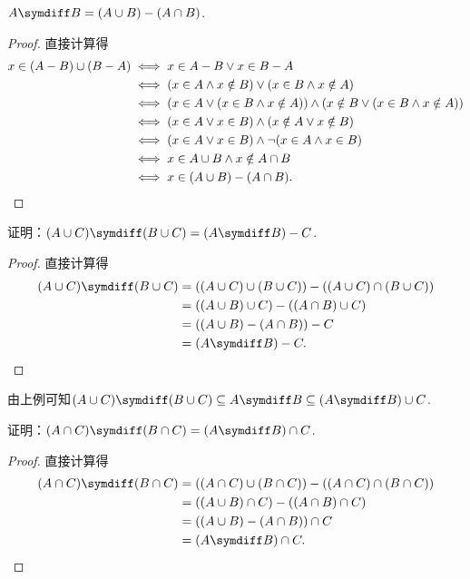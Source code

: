 \begin{theorem}
\(A \symdiff B = (A \cup B)-(A \cap B)\).
\begin{proof}
直接计算得
\begin{align*}
	x\in(A-B)\cup(B-A)
	&\iff x \in A-B \lor x \in B-A \\
	&\iff (x \in A \land x \notin B) \lor (x \in B \land x \notin A) \\
	&\iff (x \in A \lor (x \in B \land x \notin A)) \land (x \notin B \lor (x \in B \land x \notin A)) \\
	&\iff (x \in A \lor x \in B) \land (x \notin A \lor x \notin B) \\
	&\iff (x \in A \lor x \in B) \land \neg(x \in A \land x \in B) \\
	&\iff x \in A \cup B \land x \notin A \cap B \\
	&\iff x\in(A \cup B)-(A \cap B).
	\qedhere
\end{align*}
\end{proof}
\end{theorem}

\begin{example}
证明：\((A \cup C) \symdiff (B \cup C) = (A \symdiff B) - C\).
\begin{proof}
直接计算得\begin{align*}
	(A \cup C) \symdiff (B \cup C)
	&= ((A \cup C) \cup (B \cup C)) - ((A \cup C) \cap (B \cup C)) \\
	&= ((A \cup B) \cup C) - ((A \cap B) \cup C) \\
	&= ((A \cup B) - (A \cap B)) - C \\
	&= (A \symdiff B) - C.
	\qedhere
\end{align*}
\end{proof}
\end{example}
\begin{remark}
由上例可知\(
	(A \cup C) \symdiff (B \cup C)
	\subseteq
	A \symdiff B
	\subseteq
	(A \symdiff B) \cup C
\).
\end{remark}

\begin{example}
证明：\((A \cap C) \symdiff (B \cap C) = (A \symdiff B) \cap C\).
\begin{proof}
直接计算得\begin{align*}
	(A \cap C) \symdiff (B \cap C)
	&= ((A \cap C) \cup (B \cap C)) - ((A \cap C) \cap (B \cap C)) \\
	&= ((A \cup B) \cap C) - ((A \cap B) \cap C) \\
	&= ((A \cup B) - (A \cap B)) \cap C \\
	&= (A \symdiff B) \cap C.
	\qedhere
\end{align*}
\end{proof}
\end{example}

